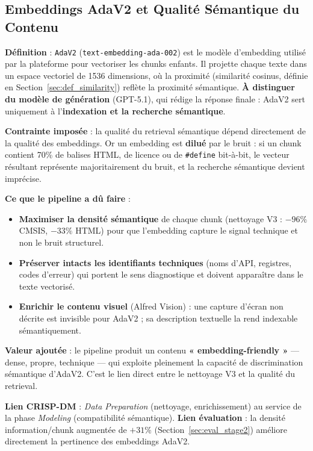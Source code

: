 \documentclass[12pt,a4paper]{report}
\begin{document}
\subsection{Embeddings AdaV2 et Qualité Sémantique du Contenu}
\label{sec:adav2}

\textbf{Définition} : \texttt{AdaV2} (\texttt{text-embedding-ada-002}) est le modèle d'embedding utilisé par la plateforme pour vectoriser les chunks enfants. Il projette chaque texte dans un espace vectoriel de 1536 dimensions, où la proximité (similarité cosinus, définie en Section~\ref{sec:def_similarity}) reflète la proximité sémantique. \textbf{À distinguer du modèle de génération} (GPT-5.1), qui rédige la réponse finale : AdaV2 sert uniquement à l'\textbf{indexation et la recherche sémantique}.

\textbf{Contrainte imposée} : la qualité du retrieval sémantique dépend directement de la qualité des embeddings. Or un embedding est \textbf{dilué} par le bruit : si un chunk contient 70\% de balises HTML, de licence ou de \texttt{\#define} bit-à-bit, le vecteur résultant représente majoritairement du bruit, et la recherche sémantique devient imprécise.

\textbf{Ce que le pipeline a dû faire} :
\begin{itemize}
  \item \textbf{Maximiser la densité sémantique} de chaque chunk (nettoyage V3 : $-96\%$ CMSIS, $-33\%$ HTML) pour que l'embedding capture le signal technique et non le bruit structurel.
  \item \textbf{Préserver intacts les identifiants techniques} (noms d'API, registres, codes d'erreur) qui portent le sens diagnostique et doivent apparaître dans le texte vectorisé.
  \item \textbf{Enrichir le contenu visuel} (Alfred Vision) : une capture d'écran non décrite est invisible pour AdaV2 ; sa description textuelle la rend indexable sémantiquement.
\end{itemize}

\textbf{Valeur ajoutée} : le pipeline produit un contenu \textbf{« embedding-friendly »} --- dense, propre, technique --- qui exploite pleinement la capacité de discrimination sémantique d'AdaV2. C'est le lien direct entre le nettoyage V3 et la qualité du retrieval.

\textbf{Lien CRISP-DM} : \textit{Data Preparation} (nettoyage, enrichissement) au service de la phase \textit{Modeling} (compatibilité sémantique). \textbf{Lien évaluation} : la densité information/chunk augmentée de $+31\%$ (Section~\ref{sec:eval_stage2}) améliore directement la pertinence des embeddings AdaV2.
\end{document}

